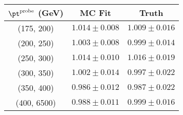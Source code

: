 \begin{tabular}{ |c|c|c| }
\hline
 $\pt^{\mathrm{probe}}$ (GeV) & MC Fit & Truth \\\hline
 (175, 200)  & $1.014 \pm 0.008$ & $1.009 \pm 0.016$ \\
 (200, 250)  & $1.003 \pm 0.008$ & $0.999 \pm 0.014$ \\
 (250, 300)  & $1.014 \pm 0.010$ & $1.016 \pm 0.019$ \\
 (300, 350)  & $1.002 \pm 0.014$ & $0.997 \pm 0.022$ \\
 (350, 400)  & $0.986 \pm 0.012$ & $0.987 \pm 0.022$ \\
 (400, 6500)  & $0.988 \pm 0.011$ & $0.999 \pm 0.016$ \\
\hline
\end{tabular}
